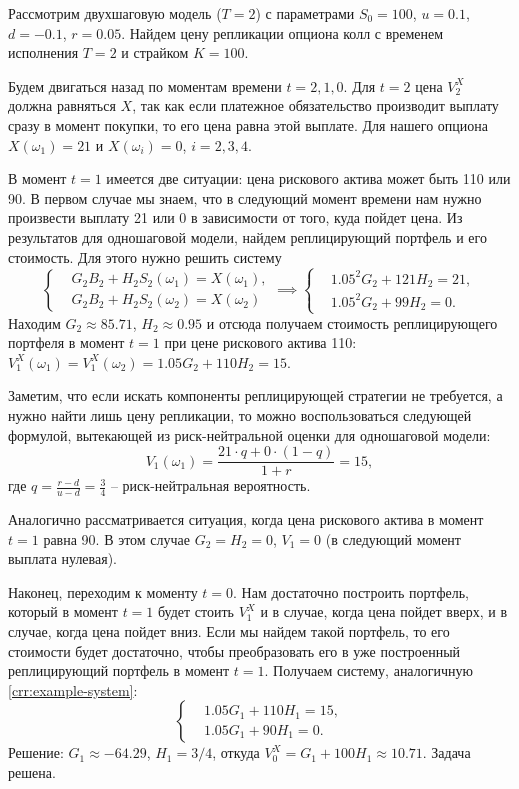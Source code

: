 \begin{example}
\label{crr:example}
Рассмотрим двухшаговую модель ($T=2$) с параметрами $S_0=100$, $u=0.1$, $d=-0.1$, $r=0.05$.
Найдем цену репликации опциона колл с временем исполнения $T=2$ и страйком $K=100$.

Будем двигаться назад по моментам времени $t=2,1,0$.
Для $t=2$ цена $V_2^X$ должна равняться $X$, так как если платежное обязательство производит выплату сразу в момент покупки, то его цена равна этой выплате.
Для нашего опциона $X(\omega_1) = 21$ и $X(\omega_i) = 0$, $i=2,3,4$.

В момент $t=1$ имеется две ситуации: цена рискового актива может быть 110 или 90.
В первом случае мы знаем, что в следующий момент времени нам нужно произвести выплату 21 или 0 в зависимости от того, куда пойдет цена.
Из результатов для одношаговой модели, найдем реплицирующий портфель и его стоимость.
Для этого нужно решить систему
\begin{equation}
\label{crr:example-system}
\left\{
\begin{aligned}
&G_2 B_2 + H_2 S_2(\omega_1) = X(\omega_1), \\
&G_2 B_2 + H_2 S_2(\omega_2) = X(\omega_2)
\end{aligned}
\right. \implies
\left\{
\begin{aligned}
&1.05^2 G_2  + 121 H_2 = 21, \\
&1.05^2 G_2 +  99 H_2 = 0.
\end{aligned}
\right.
\end{equation}
Находим $G_2 \approx 85.71$, $H_2 \approx 0.95$ и отсюда получаем стоимость реплицирующего портфеля в момент $t=1$ при цене рискового актива 110: $V_1^X(\omega_1) = V_1^X(\omega_2) = 1.05 G_2 + 110 H_2 = 15$.

Заметим, что если искать компоненты реплицирующей стратегии не требуется, а нужно найти лишь цену репликации, то можно воспользоваться следующей формулой, вытекающей из риск-нейтральной оценки для одношаговой модели:
\begin{equation}
\label{crr:example-step}
V_1(\omega_1) = \frac{21 \cdot q + 0\cdot (1-q)}{1+r} = 15,
\end{equation}
где $q = \frac{r-d}{u-d} = \frac34$ -- риск-нейтральная вероятность. 

Аналогично рассматривается ситуация, когда цена рискового актива в момент $t=1$ равна 90. В этом случае $G_2=H_2 = 0$, $V_1 = 0$ (в следующий момент выплата нулевая).

Наконец, переходим к моменту $t=0$. Нам достаточно построить портфель, который в момент $t=1$ будет стоить $V_1^X$ и в случае, когда цена пойдет вверх, и в случае, когда цена пойдет вниз. 
Если мы найдем такой портфель, то его стоимости будет достаточно, чтобы преобразовать его в уже построенный реплицирующий портфель в момент $t=1$.
Получаем систему, аналогичную \eqref{crr:example-system}:
\[
\left\{
\begin{aligned}
&1.05 G_1  + 110 H_1 = 15, \\
&1.05 G_1 +  90 H_1 = 0.
\end{aligned}
\right.
\]
Решение: $G_1\approx -64.29$, $H_1=3/4$, откуда $V_0^X = G_1 + 100 H_1 \approx 10.71$.
Задача решена.
\end{example}

